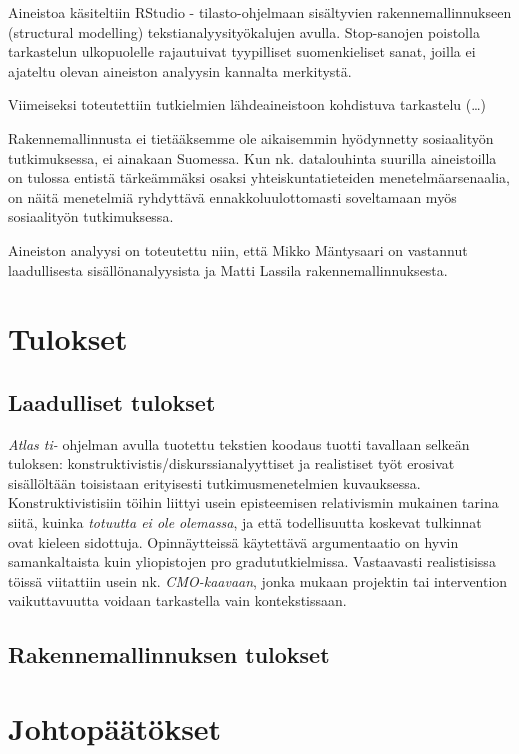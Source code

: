 \documentclass[a4paper,11pt,finnish]{article}
\begin{document}
Aineistoa käsiteltiin RStudio - tilasto-ohjelmaan sisältyvien
rakennemallinnukseen (structural modelling) tekstianalyysityökalujen
avulla. Stop-sanojen poistolla tarkastelun ulkopuolelle rajautuivat
tyypilliset suomenkieliset sanat, joilla ei ajateltu olevan aineiston
analyysin kannalta merkitystä.

Viimeiseksi toteutettiin tutkielmien lähdeaineistoon kohdistuva
tarkastelu (\ldots{})

Rakennemallinnusta ei tietääksemme ole aikaisemmin hyödynnetty
sosiaalityön tutkimuksessa, ei ainakaan Suomessa. Kun nk. datalouhinta
suurilla aineistoilla on tulossa entistä tärkeämmäksi osaksi
yhteiskuntatieteiden menetelmäarsenaalia, on näitä menetelmiä ryhdyttävä
ennakkoluulottomasti soveltamaan myös sosiaalityön tutkimuksessa.

Aineiston analyysi on toteutettu niin, että Mikko Mäntysaari on
vastannut laadullisesta sisällönanalyysista ja Matti Lassila
rakennemallinnuksesta.

\par\null\par\null

\section*{Tulokset}

{\label{431719}}\par\null\par\null\par\null

\subsection*{Laadulliset tulokset}\label{laadulliset-tulokset}

\emph{Atlas ti-} ohjelman avulla tuotettu tekstien koodaus tuotti
tavallaan selkeän tuloksen: konstruktivistis/diskurssianalyyttiset ja
realistiset työt erosivat sisällöltään toisistaan erityisesti
tutkimusmenetelmien kuvauksessa. Konstruktivistisiin töihin liittyi
usein episteemisen relativismin mukainen tarina siitä, kuinka
\emph{totuutta ei ole olemassa}, ja että todellisuutta koskevat
tulkinnat ovat kieleen sidottuja. Opinnäytteissä käytettävä
argumentaatio on hyvin samankaltaista kuin yliopistojen pro
gradututkielmissa. Vastaavasti realistisissa töissä viitattiin usein nk.
\emph{CMO-kaavaan}, jonka mukaan projektin tai intervention
vaikuttavuutta voidaan tarkastella vain kontekstissaan.

\subsection*{Rakennemallinnuksen tulokset}\label{rakennemallinnuksen-tulokset}



\section*{Johtopäätökset}






\end{document}
